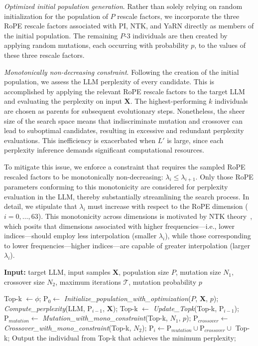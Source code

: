 \textit{Optimized initial population generation}. Rather than solely relying on random initialization for the population of $P$ rescale factors, we incorporate the three RoPE rescale factors associated with PI, NTK, and YaRN directly as members of the initial population. The remaining $P$-3 individuals are then created by applying random mutations, each occurring with probability $p$, to the values of these three rescale factors.

\textit{Monotonically non-decreasing constraint}. Following the creation of the initial population, we assess the LLM perplexity of every candidate. This is accomplished by applying the relevant RoPE rescale factors to the target LLM and evaluating the perplexity on input $\mathbf{X}$. The highest-performing $k$ individuals are chosen as parents for subsequent evolutionary steps. Nonetheless, the sheer size of the search space means that indiscriminate mutation and crossover can lead to suboptimal candidates, resulting in excessive and redundant perplexity evaluations. This inefficiency is exacerbated when $L'$ is large, since each perplexity inference demands significant computational resources.

To mitigate this issue, we enforce a constraint that requires the sampled RoPE rescaled factors to be monotonically non-decreasing: $\lambda_i \le \lambda_{i+1}$. Only those RoPE parameters conforming to this monotonicity are considered for perplexity evaluation in the LLM, thereby substantially streamlining the search process. In detail, we stipulate that $\lambda_i$ must increase with respect to the RoPE dimension ($i=0,\ldots,63$). This monotonicity across dimensions is motivated by NTK theory~\cite{jacot2018neural,tancik2020fourier,ntk}, which posits that dimensions associated with higher frequencies—i.e., lower indices—should employ less interpolation (smaller $\lambda_i$), while those corresponding to lower frequencies—higher indices—are capable of greater interpolation (larger $\lambda_i$).

\begin{algorithm}[t]
	\small
	\caption{The search algorithm}
	\textbf{Input:} target LLM, input samples $\mathbf{X}$, population size $P$, mutation size $N_1$, crossover size $N_2$, maximum iterations $\mathcal{T}$, mutation probability $p$\\

	\begin{algorithmic}[1]
		\label{alg:search}
		\STATE Top-k $\gets \phi$;	
		\STATE $\text{P}_0 \gets$ \textit{Initialize\_population\_with\_optimization}($P$, $\mathbf{X}$, $p$);
		\STATE \textit{Compute\_perplexity}(LLM, $\text{P}_{i-1}$, $\mathbf{X}$);
		\STATE Top-k $\gets$ \textit{Update\_Topk}(Top-k, $\text{P}_{i-1}$);
		\STATE $\text{P}_{mutation} \gets$ \textit{Mutation\_with\_mono\_constraint}(Top-k, $N_1$, $p$);
		\STATE $\text{P}_{crossover} \gets$ \textit{Crossover\_with\_mono\_constraint}(Top-k, $N_2$);
		\STATE $\text{P}_i \gets \text{P}_{mutation} \cup \text{P}_{crossover} \cup$ Top-k;
		\ENDFOR
		\STATE Output the individual from Top-k that achieves the minimum perplexity;
	\end{algorithmic}
\end{algorithm}

